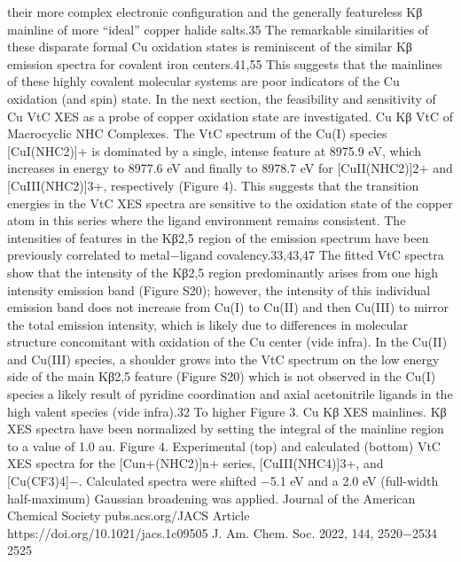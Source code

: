 \documentclass{article}
\begin{document}
their more complex electronic conﬁguration and the generally
featureless Kβ mainline of more “ideal” copper halide salts.35
The remarkable similarities of these disparate formal Cu
oxidation states is reminiscent of the similar Kβ emission
spectra for covalent iron centers.41,55 This suggests that the
mainlines of these highly covalent molecular systems are poor
indicators of the Cu oxidation (and spin) state. In the next
section, the feasibility and sensitivity of Cu VtC XES as a probe
of copper oxidation state are investigated.
Cu Kβ VtC of Macrocyclic NHC Complexes. The VtC
spectrum of the Cu(I) species [CuI(NHC2)]+ is dominated by
a single, intense feature at 8975.9 eV, which increases in energy
to 8977.6 eV and ﬁnally to 8978.7 eV for [CuII(NHC2)]2+ and
[CuIII(NHC2)]3+, respectively (Figure 4). This suggests that
the transition energies in the VtC XES spectra are sensitive to
the oxidation state of the copper atom in this series where the
ligand environment remains consistent. The intensities of
features in the Kβ2,5 region of the emission spectrum have been
previously correlated to metal−ligand covalency.33,43,47 The
ﬁtted VtC spectra show that the intensity of the Kβ2,5 region
predominantly arises from one high intensity emission band
(Figure S20); however, the intensity of this individual emission
band does not increase from Cu(I) to Cu(II) and then Cu(III)
to mirror the total emission intensity, which is likely due to
diﬀerences in molecular structure concomitant with oxidation
of the Cu center (vide infra).
In the Cu(II) and Cu(III) species, a shoulder grows into the
VtC spectrum on the low energy side of the main Kβ2,5 feature
(Figure S20) which is not observed in the Cu(I) speciesa
likely result of pyridine coordination and axial acetonitrile
ligands in the high valent species (vide infra).32 To higher
Figure 3. Cu Kβ XES mainlines. Kβ XES spectra have been
normalized by setting the integral of the mainline region to a value of
1.0 au.
Figure 4. Experimental (top) and calculated (bottom) VtC XES
spectra for the [Cun+(NHC2)]n+ series, [CuIII(NHC4)]3+, and
[Cu(CF3)4]−. Calculated spectra were shifted −5.1 eV and a 2.0 eV
(full-width half-maximum) Gaussian broadening was applied.
Journal of the American Chemical Society
pubs.acs.org/JACS
Article
https://doi.org/10.1021/jacs.1c09505
J. Am. Chem. Soc. 2022, 144, 2520−2534
2525

\newpage

\end{document}
